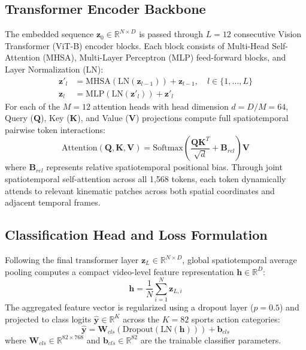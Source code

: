 \subsection{Transformer Encoder Backbone}
The embedded sequence $\mathbf{z}_0 \in \mathbb{R}^{N \times D}$ is passed through $L=12$ consecutive Vision Transformer (ViT-B) encoder blocks. Each block consists of Multi-Head Self-Attention (MHSA), Multi-Layer Perceptron (MLP) feed-forward blocks, and Layer Normalization (LN):
\begin{align}
\mathbf{z}'_l &= \text{MHSA}(\text{LN}(\mathbf{z}_{l-1})) + \mathbf{z}_{l-1}, \quad l \in \{1, \dots, L\} \\
\mathbf{z}_l &= \text{MLP}(\text{LN}(\mathbf{z}'_l)) + \mathbf{z}'_l
\end{align}
For each of the $M=12$ attention heads with head dimension $d = D/M = 64$, Query ($\mathbf{Q}$), Key ($\mathbf{K}$), and Value ($\mathbf{V}$) projections compute full spatiotemporal pairwise token interactions:
\begin{equation}
\text{Attention}(\mathbf{Q}, \mathbf{K}, \mathbf{V}) = \text{Softmax}\left(\frac{\mathbf{Q}\mathbf{K}^T}{\sqrt{d}} + \mathbf{B}_{rel}\right)\mathbf{V}
\end{equation}
where $\mathbf{B}_{rel}$ represents relative spatiotemporal positional bias. Through joint spatiotemporal self-attention across all 1,568 tokens, each token dynamically attends to relevant kinematic patches across both spatial coordinates and adjacent temporal frames.

\subsection{Classification Head and Loss Formulation}
Following the final transformer layer $\mathbf{z}_L \in \mathbb{R}^{N \times D}$, global spatiotemporal average pooling computes a compact video-level feature representation $\mathbf{h} \in \mathbb{R}^D$:
\begin{equation}
\mathbf{h} = \frac{1}{N} \sum_{i=1}^{N} \mathbf{z}_{L, i}
\end{equation}
The aggregated feature vector is regularized using a dropout layer ($p=0.5$) and projected to class logits $\hat{\mathbf{y}} \in \mathbb{R}^{K}$ across the $K=82$ sports action categories:
\begin{equation}
\hat{\mathbf{y}} = \mathbf{W}_{cls} \left( \text{Dropout}(\text{LN}(\mathbf{h})) \right) + \mathbf{b}_{cls}
\end{equation}
where $\mathbf{W}_{cls} \in \mathbb{R}^{82 \times 768}$ and $\mathbf{b}_{cls} \in \mathbb{R}^{82}$ are the trainable classifier parameters.

